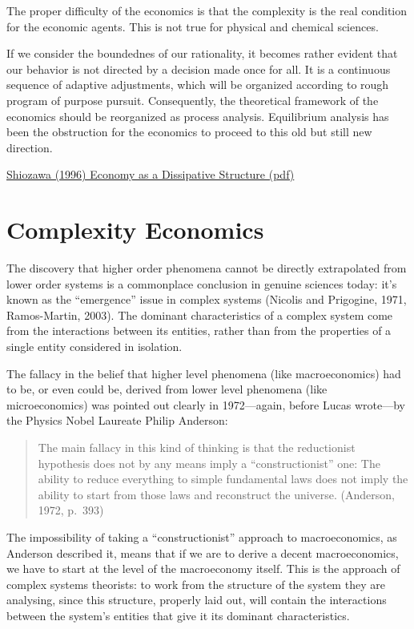 \documentclass[
]{book}
\begin{document}
The proper difficulty of the economics is that the complexity is the real
condition for the economic agents. This is not true for physical and chemical
sciences.

If we consider the boundednes of our rationality, it becomes rather evident
that our behavior is not directed by a decision made once for all. It is a
continuous sequence of adaptive adjustments, which will be organized
according to rough program of purpose pursuit.
Consequently, the
theoretical framework of the economics should be reorganized as process
analysis. Equilibrium analysis has been the obstruction for the economics to
proceed to this old but still new direction.

\href{pdf/Shiozawa_1996_Economy_as_a_Dissipative_Structure.pdf}{Shiozawa (1996) Economy as a Dissipative Structure (pdf)}

\hypertarget{complexity-economics}{%
\chapter{Complexity Economics}\label{complexity-economics}}

The discovery that higher order phenomena cannot be directly extrapolated from lower order systems is a commonplace conclusion in genuine sciences today: it's known as the ``emergence'' issue in complex systems (Nicolis and Prigogine, 1971, Ramos-Martin, 2003). The dominant characteristics of a complex system come from the interactions between its entities, rather than from the properties of a single entity considered in isolation.

The fallacy in the belief that higher level phenomena (like macroeconomics) had to be, or even could be, derived from lower level phenomena (like microeconomics) was pointed out clearly in 1972---again, before Lucas wrote---by the Physics Nobel Laureate Philip Anderson:

\begin{quote}
The main fallacy in this kind of thinking is that the reductionist hypothesis does not by any means imply a ``constructionist'' one: The ability to reduce everything to simple fundamental laws does not imply the ability to start from those laws and reconstruct the universe. (Anderson, 1972, p.~393)
\end{quote}

The impossibility of taking a ``constructionist'' approach to macroeconomics, as Anderson described it, means that if we are to derive a decent macroeconomics, we have to start at the level of the macroeconomy itself. This is the approach of complex systems theorists: to work from the structure of the system they are analysing, since this structure, properly laid out, will contain the interactions between the system's entities that give it its dominant characteristics.
\end{document}
